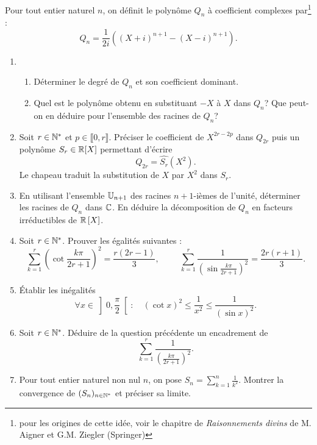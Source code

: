 Pour tout entier naturel $n$, on d{\'e}finit le polyn{\^o}me $Q_{n}$ {\`a} coefficient complexes par\footnote{pour les origines de cette idée, voir le chapitre de \emph{Raisonnements divins} de M. Aigner et G.M. Ziegler (Springer)} :
\[
Q_{n}=\frac{1}{2i}\left( (X+i)^{n+1}-(X-i)^{n+1}\right).
\]

\begin{enumerate}
\item \begin{enumerate} 
\item  D{\'e}terminer le degr{\'e} de $Q_{n}$ et son coefficient dominant.
\item Quel est le polynôme obtenu en substituant $-X$ à $X$ dans $Q_n$?\newline
Que peut-on en déduire pour l'ensemble des racines de $Q_n$?
      \end{enumerate}

\item  Soit $r \in \mathbb{N}^*$ et $p\in \llbracket 0, r \rrbracket$. Préciser le coefficient de $X^{2r-2p}$ dans $Q_{2r}$ puis un polynôme $S_r\in \mathbb{R}[X]$ permettant d'écrire 
\begin{displaymath}
 Q_{2r}=\widehat{S_r}(X^2).
\end{displaymath}
Le chapeau traduit la substitution de $X$ par $X^2$ dans $S_r$.
\item  En utilisant l'ensemble $\mathbb{U}_{n+1}$ des racines $n+1$-ièmes de l'unité, déterminer les racines de $Q_{n}$ dans $\mathbb{C}$. En d{\'e}duire la d{\'e}composition de $Q_{n}$ en facteurs irr{\'e}ductibles de $\mathbb{R}\left[ X\right]$.

\item  Soit $r\in \mathbb{N}^*$. Prouver les {\'e}galit{\'e}s suivantes :
\begin{displaymath}
\sum_{k=1}^{r} \left( \cot\frac{k\pi }{2r+1}\right) ^{2} =\frac{r(2r-1)}{3}, \hspace{1cm}
\sum_{k=1}^{r}\frac{1}{\left( \sin \frac{k\pi }{2r+1}\right)^{2} } =\frac{2r(r+1)}{3}.
\end{displaymath}

\item  \'Etablir les in{\'e}galit{\'e}s
\begin{displaymath}
\forall x\in \left] 0,\frac{\pi }{2}\right[ :\quad \left( \cot x\right)^{2}  \leq \frac{1}{x^{2}}\leq \frac{1}{(\sin x)^{2}} . 
\end{displaymath}

\item  Soit $r\in \mathbb{N}^*$. D{\'e}duire de la question pr{\'e}c{\'e}dente un encadrement de
\begin{displaymath}
\sum_{k=1}^{r}\frac{1}{\left( \frac{k\pi }{2r+1}\right) ^{2}} . 
\end{displaymath}

\item  Pour tout entier naturel non nul $n$, on pose $S_{n}=\sum_{k=1}^{n}\frac{1}{k^{2}}$. Montrer la convergence de $(S_{n})_{n\in \mathbb{N}^{*}}$ et pr{\'e}ciser sa limite.
\end{enumerate}
